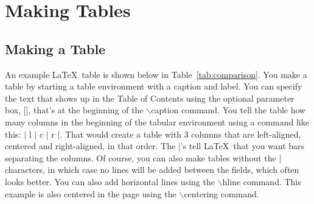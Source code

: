 \chapter{Making Tables}
\label{chp:chapter2}
\graphicspath{{figures/}{figures/chapter2/}}

\section{Making a Table}
An example \LaTeX\ table is shown below in Table~\ref{tab:comparison}.
You make a table by starting a table environment with a caption
and label.  You can specify the text that shows up in the Table of
Contents using the optional parameter box, [], that's at the
beginning of the $\backslash$caption command. You tell the table how
many columns in the beginning of the tabular environment using a
command like this: $|$ l $|$ c $|$ r $|$. That would create a table with 3 columns
that are left-aligned, centered and right-aligned, in that order. The $|$'s tell \LaTeX\ that
you want bars separating the columns. Of course, you can also make tables without the $|$ characters, in which case no lines will be added between the fields, which often looks better. You can also add horizontal
lines using the $\backslash$hline command. This example is also centered in the page using the
$\backslash$centering command.
%
\begin{table}[b]
\centering
{}
\ifdim\wd\tempbox<\TPTminimum\relax \tempwidth=\TPTminimum\relax
\else\tempwidth=\wd\tempbox
\fi
\begin{minipage}{\tempwidth}\centering
\caption[Example table]{Description of the table, where the caption is long enough to go onto more than one line. The table caption should not extend beyond the edges of the table, and should make an ``inverted pyramid.''}
\label{tab:comparison}
\usebox{\tempbox}
\end{minipage}
\end{table}
%

